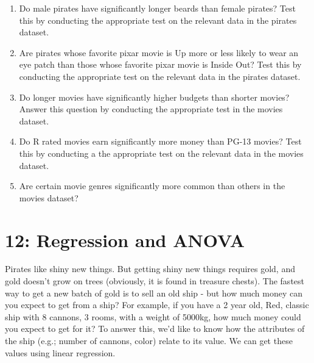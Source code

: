 \documentclass{tufte-book}\usepackage[]{graphicx}\usepackage[]{color}
\begin{document}
\begin{enumerate}

  \item Do male pirates have significantly longer beards than female pirates? Test this by conducting the appropriate test on the relevant data in the pirates dataset.

  \item Are pirates whose favorite pixar movie is Up more or less likely to wear an eye patch than those whose favorite pixar movie is Inside Out? Test this by conducting the appropriate test on the relevant data in the pirates dataset.

  \item Do longer movies have significantly higher budgets than shorter movies? Answer this question by conducting the appropriate test in the movies dataset.

  \item Do R rated movies earn significantly more money than PG-13 movies? Test this by conducting a the appropriate test on the relevant data in the movies dataset.

  \item Are certain movie genres significantly more common than others in the movies dataset?


\end{enumerate}






\chapter{12: Regression and ANOVA}
\label{ch:12}

Pirates like shiny new things. But getting shiny new things requires gold, and gold doesn't grow on trees (obviously, it is found in treasure chests). The fastest way to get a new batch of gold is to sell an old ship - but how much money can you expect to get from a ship? For example, if you have a 2 year old, Red, classic ship with 8 cannons, 3 rooms, with a weight of 5000kg, how much money could you expect to get for it? To answer this, we'd like to know how the attributes of the ship (e.g.; number of cannons, color) relate to its value. We can get these values using linear regression.
\end{document}

